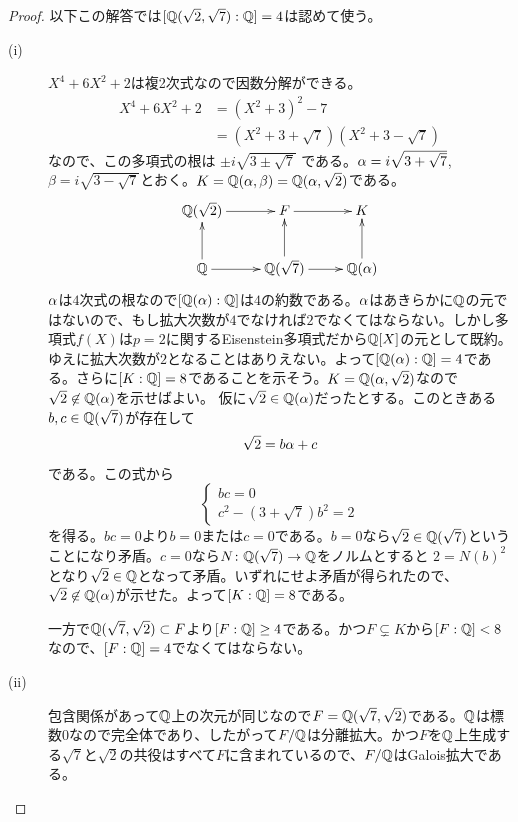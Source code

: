 \subsubsection{} %
\begin{proof} 以下この解答では$[{\mathbb Q}(\sqrt{2},\sqrt{7}): {\mathbb Q} ] = 4$は認めて使う。
  \begin{description}
\item[(i)] $X^4 + 6X^2 + 2$は複2次式なので因数分解ができる。
 \begin{align*}
  X^4 + 6X^2 + 2 &= (X^2 + 3)^2 - 7 \\
  &= (X^2 + 3 + \sqrt{7} )(X^2 + 3 - \sqrt{7} )
  \end{align*}
  なので、この多項式の根は
  $
  \pm i \sqrt{ 3 \pm \sqrt{7}  }
  $
  である。${\alpha} = i \sqrt{ 3 + \sqrt{7}  }  $, $\beta = i \sqrt{ 3 - \sqrt{7}  } $とおく。$K = {\mathbb Q}({\alpha}, \beta) = {\mathbb Q}({\alpha}, \sqrt{2})$である。
  \[
  \xymatrix{
  \Q(\sqrt{2}) \ar[r] & F \ar[r] & K \\
  \Q \ar[u] \ar[r] & \Q(\sqrt{7}) \ar[r] \ar[u] & \Q(\gra) \ar[u]
  }
  \]
  ${\alpha}$は$4$次式の根なので$[{\mathbb Q}({\alpha} ) : {\mathbb Q}]$は$4$の約数である。${\alpha}$はあきらかに${\mathbb Q}$の元ではないので、もし拡大次数が$4$でなければ$2$でなくてはならない。しかし多項式$f(X)$は$p=2$に関するEisenstein多項式だから${\mathbb Q}[X]$の元として既約。ゆえに拡大次数が$2$となることはありえない。よって$[{\mathbb Q}({\alpha} ) : {\mathbb Q}] = 4$である。さらに$[K:{\mathbb Q}] = 8$であることを示そう。$K = {\mathbb Q}({\alpha}, \sqrt{2})$なので
  $\sqrt{2} \not\in {\mathbb Q}({\alpha})$を示せばよい。
  仮に$\sqrt{2} \in {\mathbb Q}({\alpha})$だったとする。このときある$b,c \in {\mathbb Q}(\sqrt{7})$が存在して
  \[
  \sqrt{2} = b {\alpha} + c
  \]
  である。この式から
  \[
  \begin{cases}
    bc = 0 \\
    c^2 - (3 + \sqrt{7})b^2 = 2
  \end{cases}
  \]
を得る。$bc=0$より$b=0$または$c=0$である。$b=0$なら$\sqrt{2} \in {\mathbb Q}(\sqrt{7})$ということになり矛盾。$c=0$なら$N \colon {\mathbb Q}(\sqrt{7}) \to {\mathbb Q}$をノルムとすると
$
2 =  N(b)^2
$
となり$\sqrt{2} \in {\mathbb Q}$となって矛盾。いずれにせよ矛盾が得られたので、$\sqrt{2} \not\in {\mathbb Q}({\alpha})$が示せた。よって$[K:{\mathbb Q}] = 8$である。

  一方で${\mathbb Q}(\sqrt{7}, \sqrt{2}) \subset F$より$[F : {\mathbb Q}] \geq 4$である。かつ$F \subsetneq K$から$[F : {\mathbb Q}] < 8$なので、$[F : {\mathbb Q}] = 4$でなくてはならない。
  \item[(ii)] 包含関係があって${\mathbb Q}$上の次元が同じなので$F = {\mathbb Q}(\sqrt{7}, \sqrt{2})$である。${\mathbb Q}$は標数$0$なので完全体であり、したがって$F/{\mathbb Q}$は分離拡大。かつ$F$を${\mathbb Q}$上生成する$\sqrt{7}$と$\sqrt{2}$の共役はすべて$F$に含まれているので、$F/{\mathbb Q}$はGalois拡大である。
  \end{description}
\end{proof}



